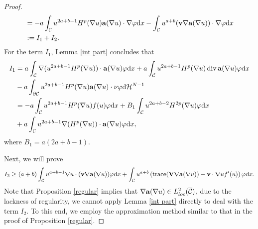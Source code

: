 \documentclass[12pt]{amsart}
\theoremstyle{definition}
\theoremstyle{remark}
\theoremstyle{conclusion}
\theoremstyle{conjecture}
\numberwithin{equation}{section}
\begin{document}
\begin{proof}
\begin{equation*}
\begin{aligned}
    &=-a\int_{\mathcal{C}}u^{2a+b-1}H^p(\nabla u){\bf{a}}(\nabla u)\cdot\nabla\varphi\mathrm{d}x-\int_{\mathcal{C}}u^{a+b}(\mathbf{v}\nabla {\bf{a}}(\nabla u))\cdot\nabla\varphi\mathrm{d}x\\
    &:=I_1+I_2.
  \end{aligned}
\end{equation*}
For the term $I_1$, Lemma \ref{int part} concludes that
\begin{equation}\label{I1}
  \begin{aligned}
    I_1&=a\int_{\mathcal{C}}\nabla(u^{2a+b-1}H^p(\nabla u))\cdot {\bf{a}}(\nabla u)\varphi\mathrm{d}x+a\int_{\mathcal{C}}u^{2a+b-1}H^p(\nabla u)\operatorname{div}{\bf{a}}(\nabla u)\varphi\mathrm{d}x\\
       &-a\int_{\partial\mathcal{C}}u^{2a+b-1}H^p(\nabla u){\bf{a}}(\nabla u)\cdot\nu\varphi\mathrm{d}\mathcal{H}^{N-1}\\
       &=-a\int_{\mathcal{C}}u^{2a+b-1}H^p(\nabla u)f(u)\varphi\mathrm{d}x+B_1\int_{\mathcal{C}}u^{2a+b-2}H^{2p}(\nabla u)\varphi\mathrm{d}x\\
       &+a\int_{\mathcal{C}}u^{2a+b-1}\nabla(H^p(\nabla u))\cdot {\bf{a}}(\nabla u)\varphi\mathrm{d}x,
  \end{aligned}
\end{equation}
where $B_1=a(2a+b-1)$.


Next, we will prove
\begin{equation}\label{II2}
 I_2\geq  (a+b)\int_{\mathcal{C}}u^{a+b-1}\nabla u\cdot (\mathbf{v}\nabla {\bf{a}}(\nabla u))\varphi\mathrm{d}x
  +\int_{\mathcal{C}}u^{a+b}\left(\operatorname{trace}(\mathbf{V}\nabla {\bf{a}}(\nabla u))-\mathbf{v}\cdot \nabla u f^{\prime}(u)\right) \varphi\mathrm{d}x.
\end{equation}
Note that Proposition \ref{regular} implies that $\nabla {\bf{a}}(\nabla u)\in L^2_{loc}(\overline{\mathcal{C}})$, due to the lackness of regularity, we cannot apply Lemma \ref{int part} directly to deal with the term $I_2$. To this end, we employ the approximation method similar to that in the proof of Proposition \ref{regular}.


\end{proof}
\end{document}

